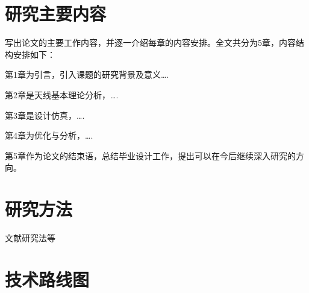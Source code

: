 \section{研究主要内容}
写出论文的主要工作内容，并逐一介绍每章的内容安排。全文共分为5章，内容结构安排如下：

第1章为引言，引入课题的研究背景及意义….

第2章是天线基本理论分析，….

第3章是设计仿真，….

第4章为优化与分析，….

第5章作为论文的结束语，总结毕业设计工作，提出可以在今后继续深入研究的方向。
\section{研究方法}
文献研究法等
\section{技术路线图}

